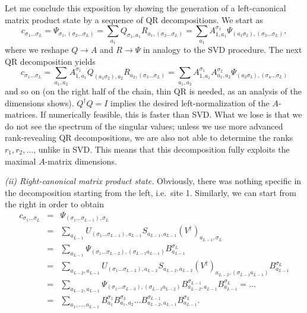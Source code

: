 Let me conclude this exposition by showing the generation of a left-canonical matrix product state by a sequence of QR decompositions. We start as
\begin{equation}
c_{\sigma_1\ldots\sigma_L} = \Psi_{\sigma_1,(\sigma_2\ldots\sigma_L)} =
\sum_{a_1} Q_{\sigma_1,a_1} R_{a_1,(\sigma_2\ldots\sigma_L)} =
\sum_{a_1} A^{\sigma_1}_{1,a_1} \Psi_{(a_1\sigma_2),(\sigma_3\ldots\sigma_L)},
\end{equation}
where we reshape $Q\rightarrow A$ and $R\rightarrow \Psi$ in analogy to the SVD procedure. The next QR decomposition yields
\begin{equation}
c_{\sigma_1\ldots\sigma_L} = \sum_{a_1,a_2} A^{\sigma_1}_{1,a_1} Q_{(a_1\sigma_2),a_2} R_{a_2,(\sigma_3\ldots\sigma_L)} = \sum_{a_1,a_2} A^{\sigma_1}_{1,a_1} A^{\sigma_2}_{a_1,a_2} \Psi_{(a_2\sigma_3),(\sigma_4\ldots\sigma_L)}
\end{equation}
and so on (on the right half of the chain, thin QR is needed, as an analysis of the dimensions shows). $Q^\dagger Q=I$ implies the desired left-normalization of the $A$-matrices. If numerically feasible, this is faster than SVD. What we lose is that we do not see the spectrum of the singular values; unless we use more advanced rank-revealing QR decompositions, we are also not able to determine the ranks $r_1, r_2, \ldots$, unlike in SVD. This means that this decomposition fully exploits the maximal $A$-matrix dimensions.

{\em (ii) Right-canonical matrix product state.} Obviously, there was nothing specific in the decomposition starting from the left, i.e.\ site 1. Similarly, we can start from the right in order to obtain
\begin{eqnarray*}
c_{\sigma_1 \ldots \sigma_L} &=& \Psi_{(\sigma_1 \ldots \sigma_{L-1}), \sigma_L} \\
&=& \sum_{a_{L-1}} U_{(\sigma_1 \ldots \sigma_{L-1}), a_{L-1}} S_{a_{L-1},a_{L-1}} (V^\dagger)_{a_{L-1},\sigma_L} \\
&=& \sum_{a_{L-1}} \Psi_{(\sigma_1 \ldots \sigma_{L-2}),(\sigma_{L-1} a_{L-1})} B^{\sigma_L}_{a_{L-1}} \\
&=& \sum_{a_{L-2}, a_{L-1}} U_{(\sigma_1 \ldots \sigma_{L-2}), a_{L-2}} S_{a_{L-2},a_{L-2}} (V^\dagger)_{a_{L-2},(\sigma_{L-1}a_{L-1})} B^{\sigma_L}_{a_{L-1}} \\
&=& \sum_{a_{L-2}, a_{L-1}} \Psi_{(\sigma_1 \ldots \sigma_{L-3}), (\sigma_{L-2} a_{L-2})} B^{\sigma_{L-1}}_{a_{L-2},a_{L-1}} B^{\sigma_L}_{a_{L-1}} = \ldots \\
&=& \sum_{a_{1},\ldots, a_{L-1}} B^{\sigma_1}_{a_{1}} B^{\sigma_{2}}_{a_{1},a_{2}} \ldots B^{\sigma_{L-1}}_{a_{L-2},a_{L-1}} B^{\sigma_L}_{a_{L-1}}.
\end{eqnarray*}

